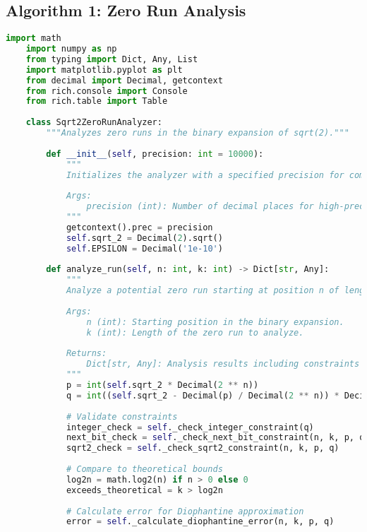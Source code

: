 \subsection{Algorithm 1: Zero Run Analysis}
\begin{lstlisting}[language=Python, style=pythonstyle, frame=single, caption={Zero Run Analysis Algorithm}]
    import math
    import numpy as np
    from typing import Dict, Any, List
    import matplotlib.pyplot as plt
    from decimal import Decimal, getcontext
    from rich.console import Console
    from rich.table import Table
    
    class Sqrt2ZeroRunAnalyzer:
        """Analyzes zero runs in the binary expansion of sqrt(2)."""
    
        def __init__(self, precision: int = 10000):
            """
            Initializes the analyzer with a specified precision for computations.
    
            Args:
                precision (int): Number of decimal places for high-precision calculations.
            """
            getcontext().prec = precision
            self.sqrt_2 = Decimal(2).sqrt()
            self.EPSILON = Decimal('1e-10')
    
        def analyze_run(self, n: int, k: int) -> Dict[str, Any]:
            """
            Analyze a potential zero run starting at position n of length k.
    
            Args:
                n (int): Starting position in the binary expansion.
                k (int): Length of the zero run to analyze.
    
            Returns:
                Dict[str, Any]: Analysis results including constraints and theoretical bounds.
            """
            p = int(self.sqrt_2 * Decimal(2 ** n))
            q = int((self.sqrt_2 - Decimal(p) / Decimal(2 ** n)) * Decimal(2 ** (n + k)))
    
            # Validate constraints
            integer_check = self._check_integer_constraint(q)
            next_bit_check = self._check_next_bit_constraint(n, k, p, q)
            sqrt2_check = self._check_sqrt2_constraint(n, k, p, q)
    
            # Compare to theoretical bounds
            log2n = math.log2(n) if n > 0 else 0
            exceeds_theoretical = k > log2n
    
            # Calculate error for Diophantine approximation
            error = self._calculate_diophantine_error(n, k, p, q)
    

\end{lstlisting}

